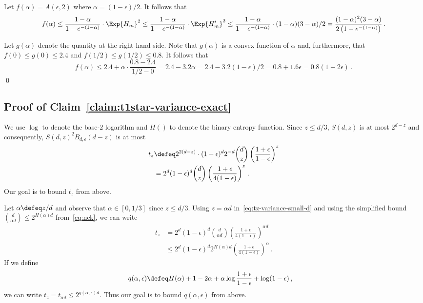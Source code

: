   Let $f(\alpha) = A(\epsilon, 2)$ where $\alpha = (1-\epsilon)/2$.
  It follows that 
  $$
    f(\alpha) 
    \leq \frac{1 - \alpha}{1 - e^{-(1 - \alpha)}} \cdot \Exp {H_m}^2
    \leq \frac{1 - \alpha}{1 - e^{-(1 - \alpha)}} \cdot \Exp {H'_m}^2
    \leq \frac{1 - \alpha}{1 - e^{-(1 - \alpha)}} \cdot (1-\alpha) (3 - \alpha)/2
    = \frac{(1 - \alpha)^2 (3 - \alpha)}{2 \left( 1 - e^{-(1 - \alpha)} \right)}
    \,.
  $$

  Let $g(\alpha)$ denote the quantity at the right-hand side. 
  Note that $g(\alpha)$ is a convex function of $\alpha$ 
  and, furthermore, that $f(0)\leq g(0) \leq 2.4$ 
  and $f(1/2) \leq g(1/2) \leq 0.8$.
  It follows that 
  $$
  f(\alpha) 
  \leq 2.4 + \alpha \cdot \frac{0.8-2.4}{1/2 - 0}
  = 2.4 - 3.2 \alpha
  = 2.4 - 3.2 (1 - \epsilon)/2
  = 0.8  + 1.6 \epsilon
  = 0.8 (1 + 2 \epsilon)
  \,.
  $$
  \hfill\qed



\subsection{Proof of Claim~\ref{claim:t1star-variance-exact}}
  We use $\log$ to denote the base-$2$ logarithm and $H()$ to denote the binary entropy function. 
  Since $z \leq d/3$, $S(d,z)$ is at most $2^{d-z}$ and consequently, 
  $S(d, z)^2 B_{d, \epsilon}(d-z)$ is at most
  \begin{align}\label{eq:tz-variance-small-d}
  t_z&\defeq 2^{2(d-z)} \cdot (1-\epsilon)^d 2^{-d} {d \choose z}  \left(\frac{1+\epsilon}{1-\epsilon}\right)^{z} \nonumber \\
  &= 2^d(1-\epsilon)^d {d \choose z} \left(\frac{1+\epsilon}{4(1-\epsilon)}\right)^{z}\,.
  \end{align}
  Our goal is to bound $t_z$ from above. 

  Let $\alpha \defeq z/d$ and observe that $\alpha \in [0, 1/3]$ since $z \leq d/3$.
  Using $z = \alpha d$ in~\eqref{eq:tz-variance-small-d} and 
  using the simplified bound $\binom{d}{\alpha d} \leq 2^{H(\alpha)d}$ from~\eqref{eq:nck}, 
  we can write
  \begin{align*}
  t_z
  &= 2^{d}(1-\epsilon)^d {d \choose \alpha d} \left(\frac{1+\epsilon}{4(1-\epsilon)}\right)^{\alpha d} \\
  &\leq 2^d
  (1-\epsilon)^d 
  2^{H(\alpha)d} 
  \left(\frac{1+\epsilon}{4(1-\epsilon)}\right)^{\alpha}
  \,.
  \end{align*}
  If we define 
  \begin{align*}
  q(\alpha, \epsilon)
  &\defeq H(\alpha)+1-2\alpha+ \alpha \log \frac{1+\epsilon}{1-\epsilon}+\log(1-\epsilon)
  \,,
  \end{align*}
  we can write $t_z = t_{\alpha d} \leq 2^{q(\alpha, \epsilon)d}$. 
  Thus our goal is to bound $q(\alpha, \epsilon)$ from above. 

